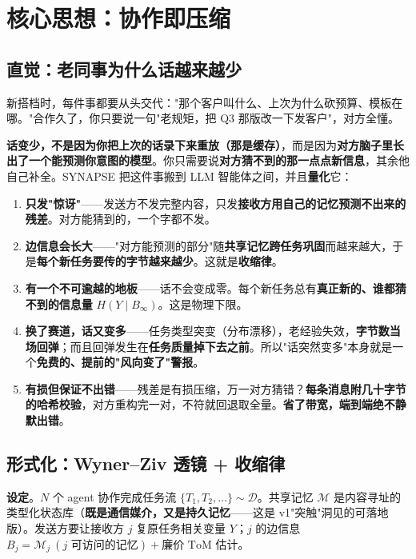 \documentclass[UTF8,fontset=windows,11pt]{ctexart}
\newcommand{\key}[1]{\textbf{\textcolor{NavyBlue}{#1}}}
\begin{document}
\section{核心思想：协作即压缩}

\subsection{直觉：老同事为什么话越来越少}
新搭档时，每件事都要从头交代："那个客户叫什么、上次为什么砍预算、模板在哪。"合作久了，你只要说一句"老规矩，把 Q3 那版改一下发客户"，对方全懂。

\textbf{话变少，不是因为你把上次的话录下来重放（那是缓存）}，而是因为\textbf{对方脑子里长出了一个能预测你意图的模型}。你只需要说\textbf{对方猜不到的那一点点新信息}，其余他自己补全。SYNAPSE 把这件事搬到 LLM 智能体之间，并且\textbf{量化}它：

\begin{enumerate}
\item \key{只发"惊讶"}——发送方不发完整内容，只发\textbf{接收方用自己的记忆预测不出来的残差}。对方能猜到的，一个字都不发。
\item \key{边信息会长大}——"对方能预测的部分"随\textbf{共享记忆跨任务巩固}而越来越大，于是\textbf{每个新任务要传的字节越来越少}。这就是\textbf{收缩律}。
\item \key{有一个不可逾越的地板}——话不会变成零。每个新任务总有\textbf{真正新的、谁都猜不到的信息量} $H(Y\mid B_\infty)$。这是物理下限。
\item \key{换了赛道，话又变多}——任务类型突变（分布漂移），老经验失效，\textbf{字节数当场回弹}；而且回弹发生在\textbf{任务质量掉下去之前}。所以"话突然变多"本身就是一个\textbf{免费的、提前的"风向变了"警报}。
\item \key{有损但保证不出错}——残差是有损压缩，万一对方猜错？\textbf{每条消息附几十字节的哈希校验}，对方重构完一对，不符就回退取全量。\textbf{省了带宽，端到端绝不静默出错}。
\end{enumerate}

\subsection{形式化：Wyner--Ziv 透镜 + 收缩律}
\textbf{设定}。$N$ 个 agent 协作完成任务流 $\{T_1,T_2,\dots\}\sim\mathcal D$。共享记忆 $\mathcal M$ 是内容寻址的类型化状态库（\textbf{既是通信媒介，又是持久记忆}——这是 v1"突触"洞见的可落地版）。发送方要让接收方 $j$ 复原任务相关变量 $Y$；$j$ 的边信息 $B_j=\mathcal M_j\ (\text{$j$ 可访问的记忆})+\text{廉价 ToM 估计}$。
\end{document}
